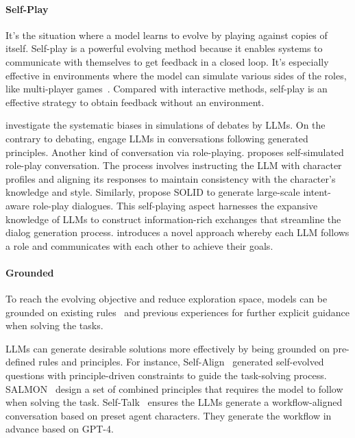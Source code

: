 \documentclass[sn-basic, Numbered]{sn-jnl}%
\theoremstyle{thmstyleone}%
\theoremstyle{thmstyletwo}%
\theoremstyle{thmstylethree}%
\begin{document}
\noindent\paragraph{Self-Play} 
It's the situation where a model learns to evolve by playing against copies of itself.
Self-play is a powerful evolving method because it enables systems to communicate with themselves to get feedback in a closed loop. It's especially effective in environments where the model can simulate various sides of the roles, like multi-player games~\cite{silver2016mastering, silver2017mastering}.
Compared with interactive methods, self-play is an effective strategy to obtain feedback without an environment. 

\citet{taubenfeld2024systematic} investigate the systematic biases in simulations of debates by LLMs. 
On the contrary to debating, \citet{ulmer2024bootstrapping} engage LLMs in conversations following generated principles. 
Another kind of conversation via role-playing. \citet{lu2024large} proposes self-simulated role-play conversation. The process involves instructing the LLM with character profiles and aligning its responses to maintain consistency with the character’s knowledge and style. 
Similarly, \citet{askari2024self} propose SOLID to generate large-scale intent-aware role-play dialogues. This self-playing aspect harnesses the expansive knowledge of LLMs to construct information-rich exchanges that streamline the dialog generation process.
\citet{wang2024sotopia} introduces a novel approach whereby each LLM follows a role and communicates with each other to achieve their goals. 


\noindent\paragraph{Grounded}
To reach the evolving objective and reduce exploration space, models can be grounded on existing rules~\cite{sun2024principle} and previous experiences for further explicit guidance when solving the tasks.


LLMs can generate desirable solutions more effectively by being grounded on pre-defined rules and principles.
For instance, Self-Align~\cite{sun2024principle} generated self-evolved questions with principle-driven constraints to guide the task-solving process.
SALMON~\cite{sun2023salmon} design a set of combined principles that requires the model to follow when solving the task.
Self-Talk~\cite{ulmer2024bootstrapping} ensures the LLMs generate a workflow-aligned conversation based on preset agent characters. They generate the workflow in advance based on GPT-4.
\end{document}
